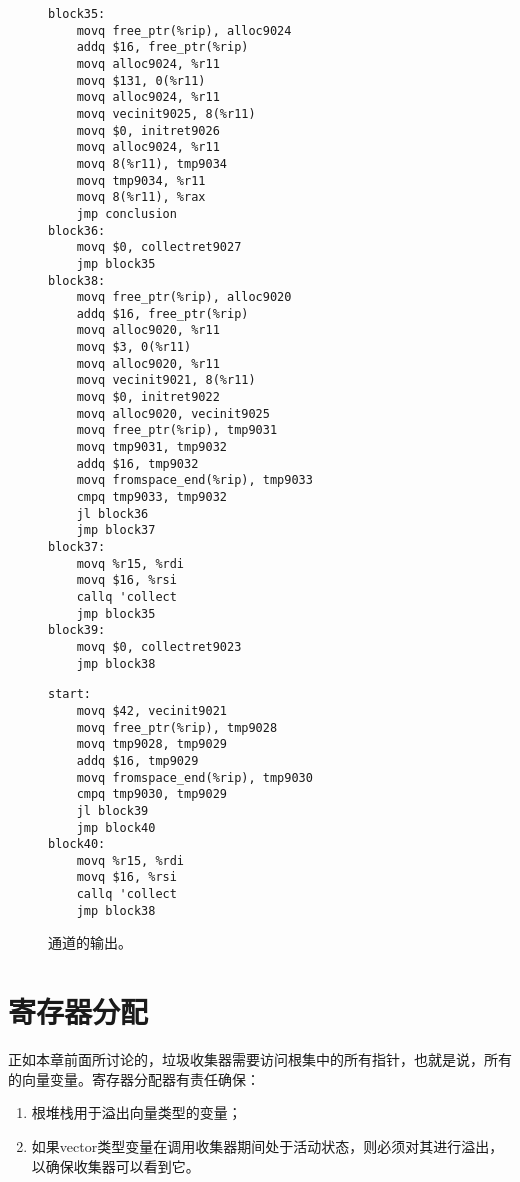 \documentclass[11pt]{book}
\begin{document}
\begin{figure}[tbp]
\centering
\begin{minipage}[t]{0.5\textwidth}
\begin{lstlisting}[basicstyle=\ttfamily\scriptsize]
block35:
    movq free_ptr(%rip), alloc9024
    addq $16, free_ptr(%rip)
    movq alloc9024, %r11
    movq $131, 0(%r11)
    movq alloc9024, %r11
    movq vecinit9025, 8(%r11)
    movq $0, initret9026
    movq alloc9024, %r11
    movq 8(%r11), tmp9034
    movq tmp9034, %r11
    movq 8(%r11), %rax
    jmp conclusion
block36:
    movq $0, collectret9027
    jmp block35
block38:
    movq free_ptr(%rip), alloc9020
    addq $16, free_ptr(%rip)
    movq alloc9020, %r11
    movq $3, 0(%r11)
    movq alloc9020, %r11
    movq vecinit9021, 8(%r11)
    movq $0, initret9022
    movq alloc9020, vecinit9025
    movq free_ptr(%rip), tmp9031
    movq tmp9031, tmp9032
    addq $16, tmp9032
    movq fromspace_end(%rip), tmp9033
    cmpq tmp9033, tmp9032
    jl block36
    jmp block37
block37:
    movq %r15, %rdi
    movq $16, %rsi
    callq 'collect
    jmp block35
block39:
    movq $0, collectret9023
    jmp block38
\end{lstlisting}
\end{minipage}
\begin{minipage}[t]{0.45\textwidth}
\begin{lstlisting}[basicstyle=\ttfamily\scriptsize]
start:
    movq $42, vecinit9021
    movq free_ptr(%rip), tmp9028
    movq tmp9028, tmp9029
    addq $16, tmp9029
    movq fromspace_end(%rip), tmp9030
    cmpq tmp9030, tmp9029
    jl block39
    jmp block40
block40:
    movq %r15, %rdi
    movq $16, %rsi
    callq 'collect
    jmp block38
\end{lstlisting}
\end{minipage}
\caption{  通道的输出。}
\label{fig:select-instr-output-gc}
\end{figure}

\clearpage

\section{寄存器分配}
\label{sec:reg-alloc-gc}

正如本章前面所讨论的，垃圾收集器需要访问根集中的所有指针，也就是说，所有的向量变量。寄存器分配器有责任确保：
\begin{enumerate}
\item 根堆栈用于溢出向量类型的变量；
\item 如果vector类型变量在调用收集器期间处于活动状态，则必须对其进行溢出，以确保收集器可以看到它。
\end{enumerate}
\end{document}
